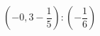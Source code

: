 \begin{ex}[type=calculate]
	\begin{condition}
		\( \left( -0,3-\dfrac{1}{5} \right):\left( -\dfrac{1}{6} \right) \)
	\end{condition}
	\answer{}
\end{ex}